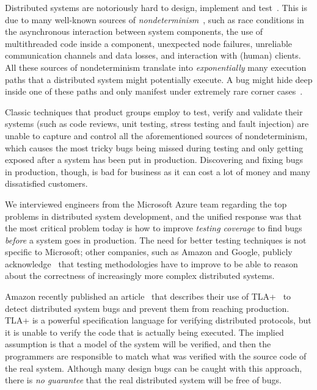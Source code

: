 Distributed systems are notoriously hard to design, implement and test~\cite{cavage2013there, laguna2015debugging, maddox2015test}. This is due to many well-known sources of \emph{nondeterminism}~\cite{chandra2007paxos}, such as race conditions in the asynchronous interaction between system components, the use of multithreaded code inside a component, unexpected node failures, unreliable communication channels and data losses, and interaction with (human) clients.
%
All these sources of nondeterminism translate into \emph{exponentially} many execution paths that a distributed system might potentially execute. A bug might hide deep inside one of these paths and only manifest under extremely rare corner cases~\cite{gray1986computers, musuvathi2008finding}.

Classic techniques that product groups employ to test, verify and validate their systems (such as code reviews, unit testing, stress testing and fault injection) are unable to capture and control all the aforementioned sources of nondeterminism, which causes the most tricky bugs being missed during testing and only getting exposed after a system has been put in production. Discovering and fixing bugs in production, though, is bad for business as it can cost a lot of money and many dissatisfied customers.

We interviewed engineers from the Microsoft Azure team regarding the top problems in distributed system development, and the unified response was that the most critical problem today is how to improve \emph{testing coverage} to find bugs \emph{before} a system goes in production. The need for better testing techniques is not specific to Microsoft; other companies, such as Amazon and Google, publicly acknowledge~\cite{newcombe2015aws} that testing methodologies have to improve to be able to reason about the correctness of increasingly more complex distributed systems.

Amazon recently published an article~\cite{newcombe2015aws} that describes their use of TLA+~\cite{lamport1994temporal} to detect distributed system bugs and prevent them from reaching production. TLA+ is a powerful specification language for verifying distributed protocols, but it is unable to verify the code that is actually being executed. The implied assumption is that a model of the system will be verified, and then the programmers are responsible to match what was verified with the source code of the real system. Although many design bugs can be caught with this approach, there is \emph{no guarantee} that the real distributed system will be free of bugs.

